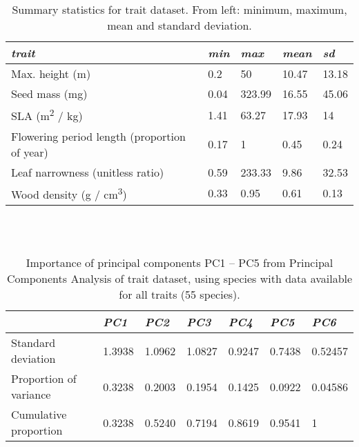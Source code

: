 \documentclass[openright,12pt,a4paper]{memoir}
\begin{document}
\begin{table}[ht]
\tiny
\centering
\caption[Summary statistics for trait dataset.]{\small{Summary statistics for trait dataset. From left: minimum, maximum, mean and standard deviation.}} \\
\label{Ch3sup2_T2} \\
{\tabulinesep=1.2mm
\begin{tabu} to 
\hline
\textit{trait} & \textit{min} & \textit{max} & \textit{mean} & \textit{sd} \\
\hline
Max. height (m) & 0.2 & 50 & 10.47 & 13.18 \\
Seed mass (mg) & 0.04 & 323.99 & 16.55 & 45.06 \\
SLA (m\textsuperscript{2} / kg) & 1.41 & 63.27 & 17.93 & 14 \\
Flowering period length \newline(proportion of year) & 0.17 & 1 & 0.45 & 0.24 \\
Leaf narrowness (unitless ratio) & 0.59 & 233.33 & 9.86 & 32.53 \\
Wood density (g / cm\textsuperscript{3}) & 0.33 & 0.95 & 0.61 & 0.13 \\
\hline
\end{tabu}}
\end{table}


\begin{table}[ht]
\tiny
\centering
\caption[Importance of principal components (trait dataset, all traits).]{\small{Importance of principal components PC1 – PC5 from Principal Components Analysis of trait dataset, using species with data available for all traits (55 species).}} \\
\label{Ch3sup2_T3} \\
{\tabulinesep=1.2mm
\begin{tabu} to 
\hline
&                      \textit{PC1}  & \textit{PC2}    & \textit{PC3}    & \textit{PC4}    & \textit{PC5}    & \textit{PC6}            \\ 
\hline
Standard deviation     & 1.3938 & 1.0962 & 1.0827 & 0.9247 & 0.7438 & 0.52457 \\
Proportion of variance & 0.3238 & 0.2003 & 0.1954 & 0.1425 & 0.0922 & 0.04586 \\
Cumulative  proportion & 0.3238 & 0.5240 & 0.7194 & 0.8619 & 0.9541 & 1      \\
\hline
\end{tabu}}
\end{table}
\end{document}
